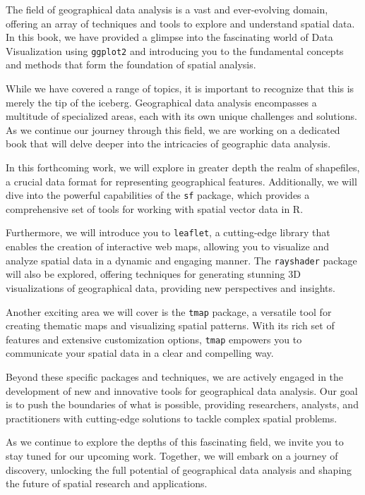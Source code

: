 \documentclass[
  letterpaper,
  DIV=11,
  numbers=noendperiod]{scrreprt}
\begin{document}
The field of geographical data analysis is a vast and ever-evolving
domain, offering an array of techniques and tools to explore and
understand spatial data. In this book, we have provided a glimpse into
the fascinating world of Data Visualization using \texttt{ggplot2} and
introducing you to the fundamental concepts and methods that form the
foundation of spatial analysis.

While we have covered a range of topics, it is important to recognize
that this is merely the tip of the iceberg. Geographical data analysis
encompasses a multitude of specialized areas, each with its own unique
challenges and solutions. As we continue our journey through this field,
we are working on a dedicated book that will delve deeper into the
intricacies of geographic data analysis.

In this forthcoming work, we will explore in greater depth the realm of
shapefiles, a crucial data format for representing geographical
features. Additionally, we will dive into the powerful capabilities of
the \texttt{sf} package, which provides a comprehensive set of tools for
working with spatial vector data in R.

Furthermore, we will introduce you to \texttt{leaflet}, a cutting-edge
library that enables the creation of interactive web maps, allowing you
to visualize and analyze spatial data in a dynamic and engaging manner.
The \texttt{rayshader} package will also be explored, offering
techniques for generating stunning 3D visualizations of geographical
data, providing new perspectives and insights.

Another exciting area we will cover is the \texttt{tmap} package, a
versatile tool for creating thematic maps and visualizing spatial
patterns. With its rich set of features and extensive customization
options, \texttt{tmap} empowers you to communicate your spatial data in
a clear and compelling way.

Beyond these specific packages and techniques, we are actively engaged
in the development of new and innovative tools for geographical data
analysis. Our goal is to push the boundaries of what is possible,
providing researchers, analysts, and practitioners with cutting-edge
solutions to tackle complex spatial problems.

As we continue to explore the depths of this fascinating field, we
invite you to stay tuned for our upcoming work. Together, we will embark
on a journey of discovery, unlocking the full potential of geographical
data analysis and shaping the future of spatial research and
applications.
\end{document}
